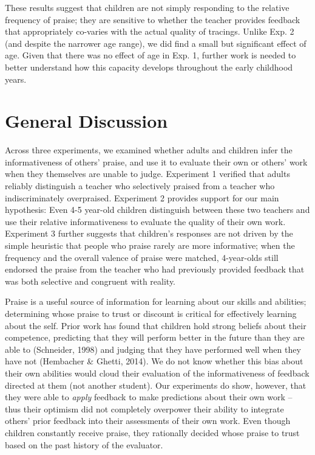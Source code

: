 \documentclass[10pt, letterpaper]{article}
\begin{document}
These results suggest that children are not simply responding to the
relative frequency of praise; they are sensitive to whether the teacher
provides feedback that appropriately co-varies with the actual quality
of tracings. Unlike Exp. 2 (and despite the narrower age range), we did
find a small but significant effect of age. Given that there was no
effect of age in Exp. 1, further work is needed to better understand how
this capacity develops throughout the early childhood years.

\section{General Discussion}\label{general-discussion}

Across three experiments, we examined whether adults and children infer
the informativeness of others' praise, and use it to evaluate their own
or others' work when they themselves are unable to judge. Experiment 1
verified that adults reliably distinguish a teacher who selectively
praised from a teacher who indiscriminately overpraised. Experiment 2
provides support for our main hypothesis: Even 4-5 year-old children
distinguish between these two teachers and use their relative
informativeness to evaluate the quality of their own work. Experiment 3
further suggests that children's responses are not driven by the simple
heuristic that people who praise rarely are more informative; when the
frequency and the overall valence of praise were matched, 4-year-olds
still endorsed the praise from the teacher who had previously provided
feedback that was both selective and congruent with reality.

Praise is a useful source of information for learning about our skills
and abilities; determining whose praise to trust or discount is critical
for effectively learning about the self. Prior work has found that
children hold strong beliefs about their competence, predicting that
they will perform better in the future than they are able to (Schneider,
1998) and judging that they have performed well when they have not
(Hembacher \& Ghetti, 2014). We do not know whether this bias about
their own abilities would cloud their evaluation of the informativeness
of feedback directed at them (not another student). Our experiments do
show, however, that they were able to \textit{apply} feedback to make
predictions about their own work -- thus their optimism did not
completely overpower their ability to integrate others' prior feedback
into their assessments of their own work. Even though children
constantly receive praise, they rationally decided whose praise to trust
based on the past history of the evaluator.
\end{document}
